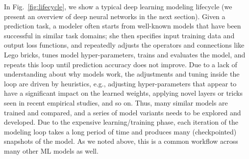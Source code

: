 \documentclass[conference]{IEEEtran}
\begin{document}
In Fig.~\ref{fig:lifecycle}, we show a typical deep learning modeling lifecycle (we present an overview of deep neural networks in the next section). Given a prediction task, a modeler often starts from well-known models that have been successful in similar task domains; she then specifies input training data and output loss functions, and repeatedly adjusts the \dnn\on operators
and connections like Lego bricks, tunes model hyper-parameters, trains and evaluates the model, and repeats this loop until prediction accuracy does not improve. Due to a lack of understanding about why models work, the adjustments and tuning inside the loop are driven by heuristics, e.g.,
adjusting hyper-parameters that appear to have a significant impact on the learned weights, applying novel layers or tricks seen in recent empirical studies, and so on. Thus, many similar models are trained and compared, and a series of model variants needs to be explored and developed. 
Due to the expensive learning/training phase, each iteration of the modeling loop takes a long period of time 
and produces many (checkpointed) snapshots of the model. As we noted above, this is a common workflow across many other ML models as well.
\end{document}
